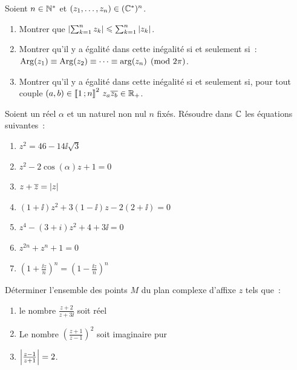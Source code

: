 \begin{exercice}
  Soient \(n \in{}\mathbb{N}^{*}\) et \((z_1, \ldots, z_n) \in{}(\mathbb{C}^{*})^n\).
  \begin{enumerate}
    \item Montrer que \( \left\lvert\sum_{k = 1}^n z_k\right\rvert \leqslant \sum_{k = 1}^n 
      \left\lvert z_k\right\rvert\).
    \item Montrer qu'il y a égalité dans cette inégalité si et seulement 
      si~: \(\operatorname{Arg}(z_1) \equiv \operatorname{Arg}(z_2) \equiv \cdots \equiv \arg(z_n) 
      \pmod{2\pi}\).
    \item Montrer qu'il y a égalité dans cette inégalité si et seulement si, 
      pour tout couple \((a,b) \in{}\mathopen{\llbracket}1\mathclose{}\mathpunct{};n\mathclose{\rrbracket}^2 \ z_a 
      \overline{z_b} \in{}\mathbb{R}_{+}\).
  \end{enumerate}
\end{exercice}

\begin{exercice}
  Soient un réel \(\alpha\) et un naturel non nul \(n\) fixés. Résoudre dans 
  \(\mathbb{C}\) les équations suivantes~:
  \begin{multicols}{2}
    \begin{enumerate}
      \item \(z^2 = 46-14\ii\sqrt{3}\)
      \item \(z^2-2\cos(\alpha)z + 1 = 0\)
      \item \(z + \overline{z} = \left\lvert z\right\rvert\)
      \item \((1 + \ii)z^2 + 3(1-\ii)z-2(2 + \ii) = 0\)
      \item \(z^4-(3 + i)z^2 + 4 + 3\ii{}= 0\)
      \item \(z^{2n} + z^n + 1 = 0\)
      \item \(\left( 1 + \frac{\ii{}z}{n} \right)^n = \left( 1-\frac{\ii{}
        z}{n} \right)^n\)
    \end{enumerate}
  \end{multicols}
\end{exercice}

\begin{exercice}
  Déterminer l'ensemble des points \(M\) du plan complexe d'affixe \(z\) tels 
  que~:
  \begin{enumerate}
    \item le nombre \(\frac{z + 2}{z + 3\ii}\) soit réel
    \item Le nombre \(\left( \frac{z + 1}{z-1} \right)^2\) soit imaginaire 
      pur
    \item \(\left\lvert\frac{z-1}{z + 1}\right\rvert = 2\).
  \end{enumerate}
\end{exercice}

